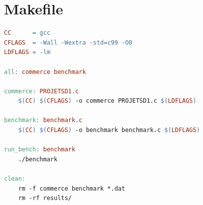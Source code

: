 \documentclass[12pt,a4paper]{report}
\begin{document}
\chapter{Makefile}

\begin{lstlisting}[language=make, caption={Makefile du projet}]
CC      = gcc
CFLAGS  = -Wall -Wextra -std=c99 -O0
LDFLAGS = -lm

all: commerce benchmark

commerce: PROJETSD1.c
	$(CC) $(CFLAGS) -o commerce PROJETSD1.c $(LDFLAGS)

benchmark: benchmark.c
	$(CC) $(CFLAGS) -o benchmark benchmark.c $(LDFLAGS)

run_bench: benchmark
	./benchmark

clean:
	rm -f commerce benchmark *.dat
	rm -rf results/
\end{lstlisting}
\end{document}
